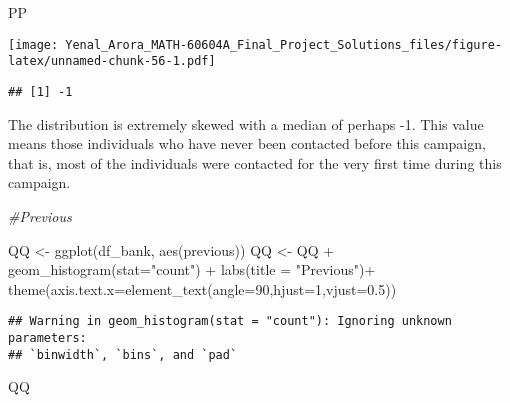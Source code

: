 \documentclass[
]{article}
\newenvironment{Shaded}{\begin{snugshade}}{\end{snugshade}}
\newcommand{\AttributeTok}[1]{\textcolor[rgb]{0.77,0.63,0.00}{#1}}
\newcommand{\CommentTok}[1]{\textcolor[rgb]{0.56,0.35,0.01}{\textit{#1}}}
\newcommand{\DecValTok}[1]{\textcolor[rgb]{0.00,0.00,0.81}{#1}}
\newcommand{\FloatTok}[1]{\textcolor[rgb]{0.00,0.00,0.81}{#1}}
\newcommand{\FunctionTok}[1]{\textcolor[rgb]{0.00,0.00,0.00}{#1}}
\newcommand{\NormalTok}[1]{#1}
\newcommand{\OtherTok}[1]{\textcolor[rgb]{0.56,0.35,0.01}{#1}}
\newcommand{\SpecialCharTok}[1]{\textcolor[rgb]{0.00,0.00,0.00}{#1}}
\newcommand{\StringTok}[1]{\textcolor[rgb]{0.31,0.60,0.02}{#1}}
\begin{document}
\begin{Shaded}
\begin{Highlighting}[]
\NormalTok{PP}
\end{Highlighting}
\end{Shaded}

\texttt{[image: Yenal\_Arora\_MATH-60604A\_Final\_Project\_Solutions\_files/figure-latex/unnamed-chunk-56-1.pdf]}

\begin{Shaded}
\end{Shaded}

\begin{verbatim}
## [1] -1
\end{verbatim}

The distribution is extremely skewed with a median of perhaps -1. This
value means those individuals who have never been contacted before this
campaign, that is, most of the individuals were contacted for the very
first time during this campaign.

\begin{Shaded}
\begin{Highlighting}[]
\CommentTok{\#Previous}

\NormalTok{QQ }\OtherTok{\textless{}{-}} \FunctionTok{ggplot}\NormalTok{(df\_bank, }\FunctionTok{aes}\NormalTok{(previous))}
\NormalTok{QQ }\OtherTok{\textless{}{-}}\NormalTok{ QQ }\SpecialCharTok{+} \FunctionTok{geom\_histogram}\NormalTok{(}\AttributeTok{stat=}\StringTok{"count"}\NormalTok{) }\SpecialCharTok{+} \FunctionTok{labs}\NormalTok{(}\AttributeTok{title =} \StringTok{"Previous"}\NormalTok{)}\SpecialCharTok{+}
  \FunctionTok{theme}\NormalTok{(}\AttributeTok{axis.text.x=}\FunctionTok{element\_text}\NormalTok{(}\AttributeTok{angle=}\DecValTok{90}\NormalTok{,}\AttributeTok{hjust=}\DecValTok{1}\NormalTok{,}\AttributeTok{vjust=}\FloatTok{0.5}\NormalTok{))}
\end{Highlighting}
\end{Shaded}

\begin{verbatim}
## Warning in geom_histogram(stat = "count"): Ignoring unknown parameters:
## `binwidth`, `bins`, and `pad`
\end{verbatim}

\begin{Shaded}
\begin{Highlighting}[]
\NormalTok{QQ}
\end{Highlighting}
\end{Shaded}
\end{document}
